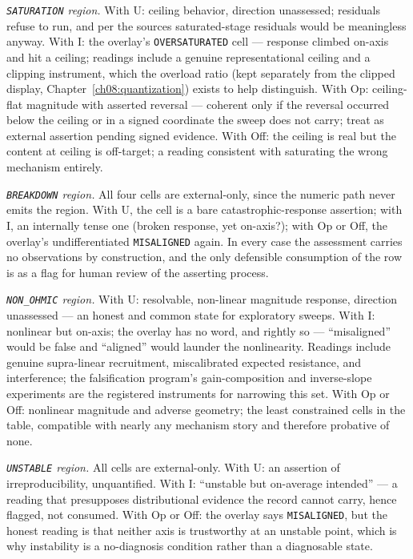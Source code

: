 \emph{\texttt{SATURATION} region.} With U: ceiling behavior, direction
unassessed; residuals refuse to run, and per the sources saturated-stage
residuals would be meaningless anyway. With I: the overlay's
\texttt{OVERSATURATED} cell --- response climbed on-axis and hit a ceiling;
readings include a genuine representational ceiling and a clipping
instrument, which the overload ratio (kept separately from the clipped
display, Chapter~\ref{ch08:quantization}) exists to help distinguish. With
Op: ceiling-flat magnitude with asserted reversal --- coherent only if the
reversal occurred below the ceiling or in a signed coordinate the sweep does
not carry; treat as external assertion pending signed evidence. With Off:
the ceiling is real but the content at ceiling is off-target; a reading
consistent with saturating the wrong mechanism entirely.

\emph{\texttt{BREAKDOWN} region.} All four cells are external-only, since
the numeric path never emits the region. With U, the cell is a bare
catastrophic-response assertion; with I, an internally tense one (broken
response, yet on-axis?); with Op or Off, the overlay's undifferentiated
\texttt{MISALIGNED} again. In every case the assessment carries no
observations by construction, and the only defensible consumption of the
row is as a flag for human review of the asserting process.

\emph{\texttt{NON\_OHMIC} region.} With U: resolvable, non-linear
magnitude response, direction unassessed --- an honest and common state for
exploratory sweeps. With I: nonlinear but on-axis; the overlay has no word,
and rightly so --- ``misaligned'' would be false and ``aligned'' would
launder the nonlinearity. Readings include genuine supra-linear
recruitment, miscalibrated expected resistance, and interference; the
falsification program's gain-composition and inverse-slope experiments are
the registered instruments for narrowing this set. With Op or Off: nonlinear
magnitude and adverse geometry; the least constrained cells in the table,
compatible with nearly any mechanism story and therefore probative of none.

\emph{\texttt{UNSTABLE} region.} All cells are external-only. With U: an
assertion of irreproducibility, unquantified. With I: ``unstable but
on-average intended'' --- a reading that presupposes distributional evidence
the record cannot carry, hence flagged, not consumed. With Op or Off: the
overlay says \texttt{MISALIGNED}, but the honest reading is that neither
axis is trustworthy at an unstable point, which is why instability is a
no-diagnosis condition rather than a diagnosable state.

